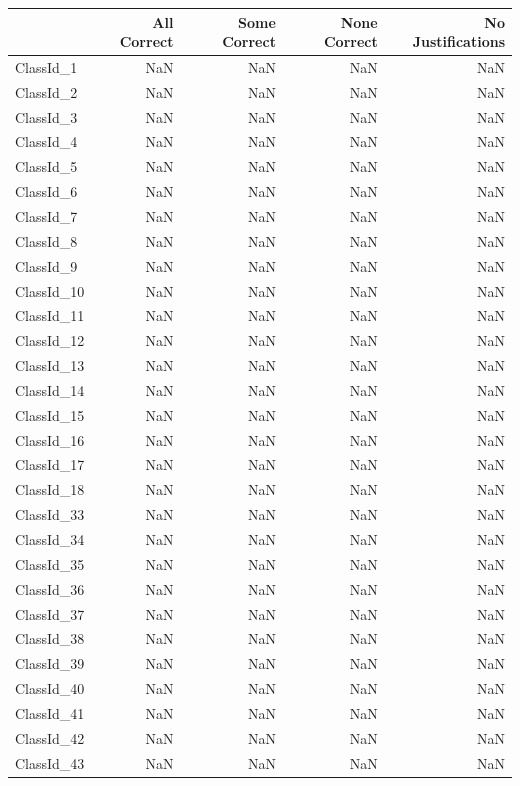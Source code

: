 \begin{tabular}{lrrrr}
\toprule
 & All Correct & Some Correct & None Correct & No Justifications \\
\midrule
ClassId_1 & NaN & NaN & NaN & NaN \\
ClassId_2 & NaN & NaN & NaN & NaN \\
ClassId_3 & NaN & NaN & NaN & NaN \\
ClassId_4 & NaN & NaN & NaN & NaN \\
ClassId_5 & NaN & NaN & NaN & NaN \\
ClassId_6 & NaN & NaN & NaN & NaN \\
ClassId_7 & NaN & NaN & NaN & NaN \\
ClassId_8 & NaN & NaN & NaN & NaN \\
ClassId_9 & NaN & NaN & NaN & NaN \\
ClassId_10 & NaN & NaN & NaN & NaN \\
ClassId_11 & NaN & NaN & NaN & NaN \\
ClassId_12 & NaN & NaN & NaN & NaN \\
ClassId_13 & NaN & NaN & NaN & NaN \\
ClassId_14 & NaN & NaN & NaN & NaN \\
ClassId_15 & NaN & NaN & NaN & NaN \\
ClassId_16 & NaN & NaN & NaN & NaN \\
ClassId_17 & NaN & NaN & NaN & NaN \\
ClassId_18 & NaN & NaN & NaN & NaN \\
ClassId_33 & NaN & NaN & NaN & NaN \\
ClassId_34 & NaN & NaN & NaN & NaN \\
ClassId_35 & NaN & NaN & NaN & NaN \\
ClassId_36 & NaN & NaN & NaN & NaN \\
ClassId_37 & NaN & NaN & NaN & NaN \\
ClassId_38 & NaN & NaN & NaN & NaN \\
ClassId_39 & NaN & NaN & NaN & NaN \\
ClassId_40 & NaN & NaN & NaN & NaN \\
ClassId_41 & NaN & NaN & NaN & NaN \\
ClassId_42 & NaN & NaN & NaN & NaN \\
ClassId_43 & NaN & NaN & NaN & NaN \\
\bottomrule
\end{tabular}
